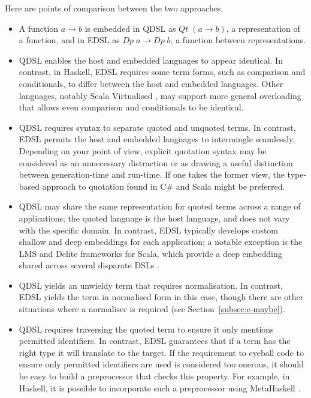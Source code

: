 \documentclass[authoryear,9pt]{sigplanconf}
\newcommand{\Conid}[1]{\mathit{#1}}
\newcommand{\Varid}[1]{\mathit{#1}}
\begin{document}
Here are points of comparison between the two approaches.
\begin{itemize}

\item A function \ensuremath{\Varid{a}\to \Varid{b}} is embedded in
QDSL as \ensuremath{\Conid{Qt}\;(\Varid{a}\to \Varid{b})}, a representation of a function, and in
EDSL as \ensuremath{\Conid{Dp}\;\Varid{a}\to \Conid{Dp}\;\Varid{b}}, a function between representations.

\item QDSL enables the host and embedded languages to appear
identical.  In contrast, in Haskell, EDSL requires some term forms,
such as comparison and conditionals, to differ between the host and
embedded languages.  Other languages, notably Scala Virtualised
\citep{rompf2013scala}, may support more general overloading that
allows even comparison and conditionals to be identical.

\item QDSL requires syntax to separate quoted and unquoted terms. In
contrast, EDSL permits the host and embedded languages to intermingle
seamlessly. Depending on your point of view, explicit quotation syntax
may be considered as an unnecessary distraction or as drawing a useful
distinction between generation-time and run-time.  If one takes the
former view, the type-based approach to quotation found in C\# and
Scala might be preferred.

\item QDSL may share the same representation for quoted terms across a
range of applications; the quoted language is the host language, and
does not vary with the specific domain.  In contrast, EDSL typically
develops custom shallow and deep embeddings for each application;
a notable exception is the LMS and Delite frameworks for Scala,
which provide a deep embedding shared across several disparate DSLs
\citep{sujeeth2013composition}.

\item QDSL yields an unwieldy term that requires normalisation.  In
contrast, EDSL yields the term in normalised form in this case, though
there are other situations where a normaliser is required (see
Section~\ref{subsec:e-maybe}).

\item QDSL requires traversing the quoted term to ensure it only
mentions permitted identifiers. In contrast, EDSL guarantees that if a
term has the right type it will translate to the target.  If the
requirement to eyeball code to ensure only permitted identifiers are
used is considered too onerous, it should be easy to build a
preprocessor that checks this property. For example, in Haskell, it is
possible to incorporate such a preprocessor using MetaHaskell
\cite{metahaskell}.


\end{itemize}
\end{document}
